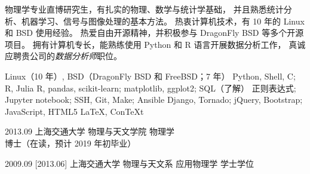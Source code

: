 \documentclass[zh]{resume}
\newcommand{\myposition}{数据分析师}
\begin{document}
\makeheader

{\onehalfspacing\hspace{1.7em}
物理学专业直博研究生，有扎实的物理、数学与统计学基础，
并且熟悉统计分析、机器学习、信号与图像处理的基本方法。
热衷计算机技术，有 10 年的 Linux 和 BSD 使用经验。
热爱自由开源精神，并积极参与 DragonFly BSD 等多个开源项目。
拥有计算机专长，能熟练使用 Python 和 R 语言开展数据分析工作，
真诚应聘贵公司的\emph{\myposition}职位。
\par}  %

\begin{competences}
    {Linux（10 年）, BSD（DragonFly BSD 和 FreeBSD；7 年）}
    {Python, Shell, C; R, Julia}
    {R, pandas, scikit-learn; matplotlib, ggplot2; SQL（了解）}
    {正则表达式; Jupyter notebook; SSH, Git, Make; Ansible}
    {Django, Tornado; jQuery, Bootstrap; JavaScript, HTML5}
    {\LaTeX, Con\TeX{}t}
\end{competences}

\begin{educations}
  \education%
    {2013.09}%
    {上海交通大学}%
    {物理与天文学院}%
    {物理学}%
    {博士（在读，预计 2019 年初毕业）}

  \separator{0.7em}
  \education%
    {2009.09}%
    [2013.06]%
    {上海交通大学}%
    {物理与天文系}%
    {应用物理学}%
    {学士学位}
\end{educations}
\end{document}
